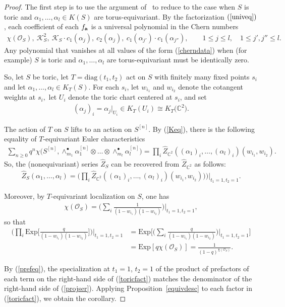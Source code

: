 \documentclass[pdftex]{sigma}
\numberwithin{equation}{section}
\newcommand{\diag}{\mathrm{diag}}
\newcommand{\Exp}{\mathrm{Exp}}
\def\O{\mathcal{O}}
\def\C{\mathbb C}
\begin{document}
\begin{proof}
The first step is to use the argument of~\cite[Sections~4 and~5]{EGL} to reduce to the case when $S$ is toric and $\alpha_1,\dots,\alpha_l\in K(S)$ are torus-equivariant. By the factorization $(\ref{univeq})$, each coefficient of each $f_{\bf a}$ is a universal polynomial in the Chern numbers \begin{align}\label{cherndata}
\chi(\mathcal{O}_{S}),\ \mathcal{K}_{S}^2,\ \mathcal{K}_{S}\cdot c_1(\alpha_j),\ c_2(\alpha_j),\ c_1(\alpha_{j'})\cdot c_1(\alpha_{j''}),\qquad
1\leq j \leq l,\quad 1\leq j',j''\leq l.
\end{align}
Any polynomial that vanishes at all values of the form (\ref{cherndata}) when (for example) $S$ is toric and $\alpha_1,\dots,\alpha_l$ are torus-equivariant must be identically zero.

So, let $S$ be toric, let $T=\diag(t_1,t_2)$ act on $S$ with finitely many fixed points $s_i$ and let $\alpha_1,\dots,\alpha_l\in K_T(S)$. For each $s_i$, let $w_{i_1}$ and $w_{i_2}$ denote the cotangent weights at $s_i,$ let $U_i$ denote the toric chart centered at $s_i$, and set
\begin{gather*}
(\alpha_j)_i=\alpha_j|_{U_i}\in K_T(U_i)\cong K_T\big(\C^2\big).
\end{gather*}

The action of $T$ on $S$ lifts to an action on $S^{[n]}$. By (\ref{Keq}), there is the following equality of $T$-equivariant Euler characteristics
\begin{align*}
\sum_{n\geq 0} q^{n} \chi\big(S^{[n]}, \wedge^{\bullet}_{m_1} \alpha_1^{[n]} \otimes \dots \otimes \wedge^{\bullet}_{m_l} \alpha_l^{[n]} \big)=\prod_{i} \hat{Z}_{\C^2}((\alpha_1)_i,\dots,(\alpha_l)_i)(w_{i_1},w_{i_2}).
\end{align*}
So, the (nonequivariant) series $\hat{Z}_{S}$ can be recovered from $\hat{Z}_{\C^2}$ as follows: \begin{align}\label{toricfact}
\hat{Z}_{S}(\alpha_1,\dots,\alpha_l)=\bigg(\prod_{i} \hat{Z}_{\C^2}((\alpha_1)_i,\dots,(\alpha_l)_i)(w_{i_1},w_{i_2})) \bigg)\bigg|_{t_1=1,t_2=1}.
\end{align}

Moreover, by $T$-equivariant localization on $S$, one has
\begin{gather*}
\chi(\O_{S})=\bigg(\sum_{i} \frac{1}{(1-w_{i_1})(1-w_{i_2})}\bigg)\bigg |_{t_1=1,t_2=1},
\end{gather*}
so that
\begin{align}\nonumber
\bigg(\prod_{i} \Exp\bigg [\frac{q}{(1-w_{i_1})(1-w_{i_2})}\bigg ] \bigg)\bigg |_{t_1=1,t_2=1}&=\Exp\bigg[\bigg(\sum_{i} \frac{q}{(1-w_{i_1})(1-w_{i_2})}\bigg)\bigg |_{t_1=1,t_2=1}\bigg]\nonumber
\\
&=\Exp[q\chi(\O_S)]=\frac{1}{(1-q)^{\chi(\O_S)}}.
\label{prefeq}
\end{align}

By (\ref{prefeq}), the specialization at $t_1=1$, $t_2=1$ of the product of prefactors of each term on the right-hand side of (\ref{toricfact}) matches the denominator of the right-hand side of (\ref{projser}). Applying Proposition~\ref{equivdesc} to each factor in (\ref{toricfact}), we obtain the corollary. \end{proof}
\end{document}
